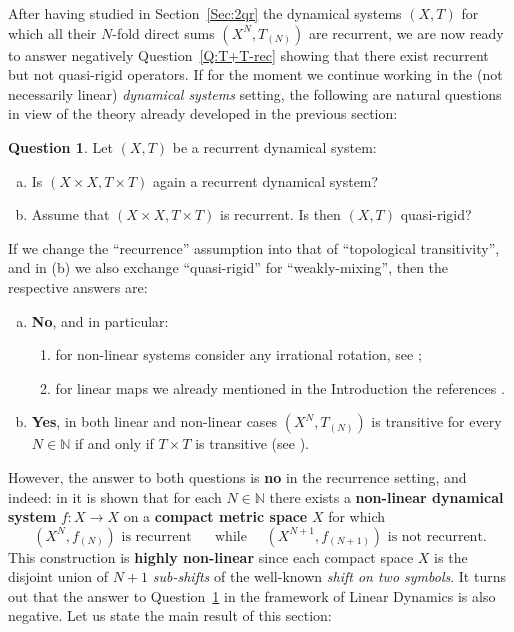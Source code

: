 \documentclass[openright,11pt]{article}
\theoremstyle{plain}
\theoremstyle{definition}
\newtheorem{question}[theorem]{Question}
\newcommand{\NN}{\mathbb{N}}
\begin{document}
After having studied in Section~\ref{Sec:2qr} the dynamical systems $(X,T)$ for which all their $N$-fold direct sums $(X^N,T_{(N)})$ are recurrent, we are now ready to answer negatively Question~\ref{Q:T+T-rec} showing that there exist recurrent but not quasi-rigid operators. If for the moment we continue working in the (not necessarily linear) {\em dynamical systems} setting, the following are natural questions in view of the theory already developed in the previous section:
\begin{question}\label{Q:T+T->qr}
	Let $(X,T)$ be a recurrent dynamical system:
	\begin{enumerate}[(a)]
		\item Is $(X\times X,T\times T)$ again a recurrent dynamical system?
		
		\item Assume that $(X\times X,T\times T)$ is recurrent. Is then $(X,T)$ quasi-rigid?
	\end{enumerate}
\end{question}
If we change the ``recurrence'' assumption into that of ``topological transitivity'', and in (b) we also exchange ``quasi-rigid'' for ``weakly-mixing'', then the respective answers are:
\begin{enumerate}[(a)]
	\item \textbf{No}, and in particular:
	\begin{enumerate}[--]
		\item for non-linear systems consider any irrational rotation, see \cite[Example~1.43]{GrPe2011_book};
		
		\item for linear maps we already mentioned in the Introduction the references \cite{DeRead2009,BaMa2007nwm,BaMa2009nwm}.
	\end{enumerate}
	
	\item \textbf{Yes}, in both linear and non-linear cases $(X^N,T_{(N)})$ is transitive for every $N \in \NN$ if and only if $T\times T$ is transitive (see \cite[Theorem~1.51]{GrPe2011_book}). 
\end{enumerate}

However, the answer to both questions is \textbf{no} in the recurrence setting, and indeed: in \cite[Lemma~9 and Example~4]{Banks1999} it is shown that for each $N \in \NN$ there exists a \textbf{non-linear dynamical system} $f:X\longrightarrow X$ on a \textbf{compact metric space} $X$ for which
\[
(X^N,f_{(N)}) \text{ is recurrent }\quad \text{ while } \quad (X^{N+1},f_{(N+1)}) \text{ is not recurrent}.
\]
This construction is \textbf{highly non-linear} since each compact space $X$ is the disjoint union of $N+1$ {\em sub-shifts} of the well-known {\em shift on two symbols}. It turns out that the answer to Question~\ref{Q:T+T->qr} in the framework of Linear Dynamics is also negative. Let us state the main result of this section:
\end{document}
